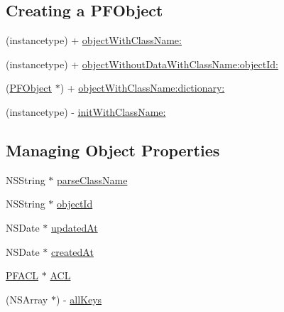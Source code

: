 \subsection*{Creating a P\+F\+Object}
\label{_amgrpb4032590b04677ab2853e1bcb1c62401}%


 

 \begin{DoxyCompactItemize}
\item 
(instancetype) + \hyperlink{interface_p_f_object_a4efd97521f641676eb91165c0c0d2365}{object\+With\+Class\+Name\+:}
\item 
(instancetype) + \hyperlink{interface_p_f_object_a2cbc64dd7c830796cb27873d17ad1696}{object\+Without\+Data\+With\+Class\+Name\+:object\+Id\+:}
\item 
(\hyperlink{interface_p_f_object}{P\+F\+Object} $\ast$) + \hyperlink{interface_p_f_object_aa43c02aea2c183aaec624e5ef1e3abf7}{object\+With\+Class\+Name\+:dictionary\+:}
\item 
(instancetype) -\/ \hyperlink{interface_p_f_object_ad98dd444e5e56becfc4e0682d93cd6e2}{init\+With\+Class\+Name\+:}
\end{DoxyCompactItemize}
\subsection*{Managing Object Properties}
\label{_amgrp467078e03296ee05692a2db747be7751}%


 

 \begin{DoxyCompactItemize}
\item 
N\+S\+String $\ast$ \hyperlink{interface_p_f_object_acd02c0585de1cc52e3adae4f3ea631aa}{parse\+Class\+Name}
\item 
N\+S\+String $\ast$ \hyperlink{interface_p_f_object_ac957b8fb3842dcf264264c3f4af836f6}{object\+Id}
\item 
N\+S\+Date $\ast$ \hyperlink{interface_p_f_object_aa0bd6d2f6c6489b6cc06ef043c4b179a}{updated\+At}
\item 
N\+S\+Date $\ast$ \hyperlink{interface_p_f_object_ab9baa371bf6fc375e538dec6e95c4200}{created\+At}
\item 
\hyperlink{interface_p_f_a_c_l}{P\+F\+A\+C\+L} $\ast$ \hyperlink{interface_p_f_object_ad09c7decbf32c9119852e30da0bf09a6}{A\+C\+L}
\item 
(N\+S\+Array $\ast$) -\/ \hyperlink{interface_p_f_object_a2ec332a3b46b46cc7d9890cb83057066}{all\+Keys}
\end{DoxyCompactItemize}


